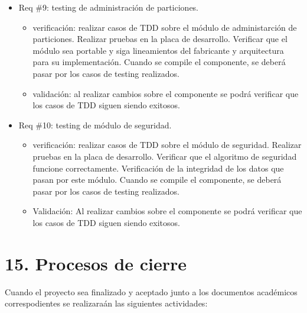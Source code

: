\documentclass[
11pt, %
]{charter}
\begin{document}
\begin{itemize} 
\item Req \#9: testing de administración de particiones.

\begin{itemize}
	\item verificación: realizar casos de TDD sobre el módulo de administarción de particiones. Realizar pruebas en la placa de desarrollo. Verificar que el módulo sea portable y siga lineamientos del fabricante y arquitectura para su implementación. Cuando se compile el componente, se deberá pasar por los casos de testing realizados.
	\item validación: al realizar cambios sobre el componente se podrá verificar que los casos de TDD siguen siendo exitosos.
\end{itemize}

\end{itemize}
\newpage

\begin{itemize} 
\item Req \#10: testing de módulo de seguridad.

\begin{itemize}
	\item verificación: realizar casos de TDD sobre el módulo de seguridad. Realizar pruebas en la placa de desarrollo. Verificar que el algoritmo de seguridad funcione correctamente. Verificación de la integridad de los datos que pasan por este módulo. Cuando se compile el componente, se deberá pasar por los casos de testing realizados.
	\item Validación: Al realizar cambios sobre el componente se podrá verificar que los casos de TDD siguen siendo exitosos.
\end{itemize}

\end{itemize}

\section{15. Procesos de cierre}    
\label{sec:cierre}

Cuando el proyecto sea finalizado y aceptado junto a los documentos académicos correspodientes se realizaraán las siguientes actividades:
\end{document}
